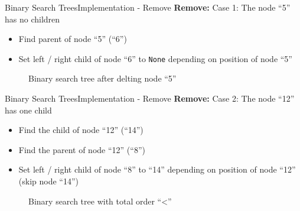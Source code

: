 \begin{frame}{Binary Search Trees}{Implementation - Remove}
  \textbf{Remove:} Case 1: The node \enquote{5} has no children\\
  \begin{itemize}
    \item
      Find {\color{Mittel-Blau}parent} of node \enquote{5} (\enquote{6})
    \item
      Set left / right child of node \enquote{6} to
      \texttt{\color{Mittel-Blau}None} depending on position of node \enquote{5}
  \end{itemize}
  \begin{figure}
    
    \caption{Binary search tree after delting node \enquote{5}}
    \label{fig:binary_search_trees:binary_tree_remove_no_child_result}
  \end{figure}
\end{frame}


\begin{frame}{Binary Search Trees}{Implementation - Remove}
  \textbf{Remove:} Case 2: The node \enquote{12} has one child\\
  \begin{itemize}
    \item
      Find the {\color{Mittel-Blau}child} of node \enquote{12} (\enquote{14})
    \item
      Find the {\color{Mittel-Blau}parent} of node \enquote{12} (\enquote{8})
    \item
      Set left / right {\color{Mittel-Blau}child} of node \enquote{8} to
      \enquote{14} depending on position of node \enquote{12}
      (skip node \enquote{14})
  \end{itemize}
  \vspace{-0.5em}
  \begin{figure}
    
    \vspace{-0.75em}
    \caption{Binary search tree with total order
      \enquote{\color{Mittel-Blau}<}}
    \label{fig:binary_search_trees:binary_tree_remove_one_child}
  \end{figure}
\end{frame}


